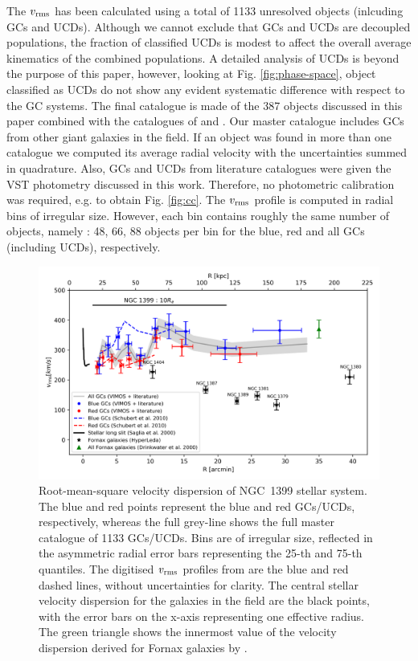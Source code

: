 \documentclass[useAMS,usenatbib]{mn2e}
\begin{document}
The $v_{\rm rms}$ has been calculated using a total of 1133 unresolved objects 
(inlcuding GCs and UCDs). Although we cannot exclude that GCs and UCDs are 
decoupled populations, 
the fraction of classified UCDs is modest to affect the overall average 
kinematics of the combined populations. A detailed analysis of UCDs is beyond 
the purpose of this paper,
however, looking at Fig. \ref{fig:phase-space}, object classified as UCDs do 
not show any evident systematic difference with respect to the GC systems. 
The final catalogue is made of the 387 objects discussed in this paper 
combined with the catalogues of \citet{Bergond07} and \citet{Schuberth}. Our master catalogue
includes GCs from other giant galaxies in the field. If an 
object was found in more than one catalogue we computed its average radial 
velocity with the uncertainties summed in quadrature. Also, GCs and UCDs from 
literature catalogues were given the VST photometry discussed in this work. 
Therefore, no photometric calibration was required, e.g. to obtain Fig. 
\ref{fig:cc}. The $v_{\rm rms}$ profile is computed in radial bins of irregular 
size. However, each bin contains roughly the same number of objects, namely : 
48, 66, 88 objects per bin for the blue, red and all GCs (including UCDs), respectively. 

\begin{figure}
\centering
\includegraphics[scale = 0.8]{figures/vrms.png} 
\caption{Root-mean-square velocity dispersion of NGC~1399 stellar system. The 
blue and red points represent the blue and red GCs/UCDs, respectively, whereas 
the full grey-line shows the full master catalogue of 1133 GCs/UCDs. Bins are 
of irregular size, reflected in the asymmetric radial error bars representing 
the 25-th and 75-th quantiles. The digitised $v_{\rm rms}$ profiles from 
\citet{Schuberth} are the blue and red dashed lines, without uncertainties for 
clarity. The central stellar velocity dispersion for the galaxies in the field 
are the black points, with the error bars on the x-axis representing one 
effective radius. The green triangle shows the innermost value of the velocity 
dispersion derived for Fornax galaxies by \citet{Drinkwater00}.}
\label{fig:vrms}
\end{figure}
\end{document}
